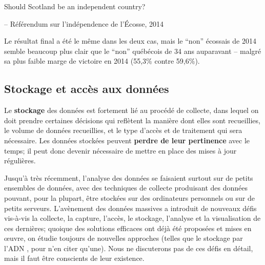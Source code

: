 \begin{tcolorbox}[title=Ont-ils tiré des lessons du r\'ef\'erendum de 1980?]
Should Scotland be an independent country? \\[-0.6cm]
\begin{flushright}
-- R\'ef\'erendum sur l'ind\'ependence de l'\'Ecosse, 2014
\end{flushright}
\end{tcolorbox}
\noindent Le résultat final a été le même dans les deux cas, mais le ``non'' écossais de 2014 semble  beaucoup plus clair que le ``non'' québécois de 34 ans auparavant -- malgré sa plus faible marge de victoire en 2014 (55,3\% contre 59,6\%). 
\subsection{Stockage et accès aux données}
Le \textbf{stockage} des données est fortement lié au procédé de collecte, dans lequel on doit prendre certaines décisions qui reflètent la manière dont elles sont recueillies, le volume de données recueillies, et le type d'accès et de traitement qui sera nécessaire. Les données stockées peuvent \textbf{perdre de leur pertinence} avec le temps; il peut donc devenir nécessaire de mettre en place des mises à jour régulières. 
\par
Jusqu'à très récemment, l'analyse des données se faisaient surtout sur de petits ensembles de données, avec des techniques de collecte produisant des données pouvant, pour la plupart, être stockées sur des ordinateurs personnels ou sur de petits serveurs. L'avènement des données massives a introduit de nouveaux défis vis-\`a-vis la collecte, la capture, l'accès, le stockage, l'analyse et la visualisation de ces dernières; quoique des  solutions efficaces ont déjà été proposées et mises en œuvre, on étudie toujours de nouvelles approches (telles que le stockage par l'ADN \cite{DC_DNA}, pour n'en citer qu'une). Nous ne discuterons pas de ces défis en détail, mais il faut être conscients de leur existence.  
